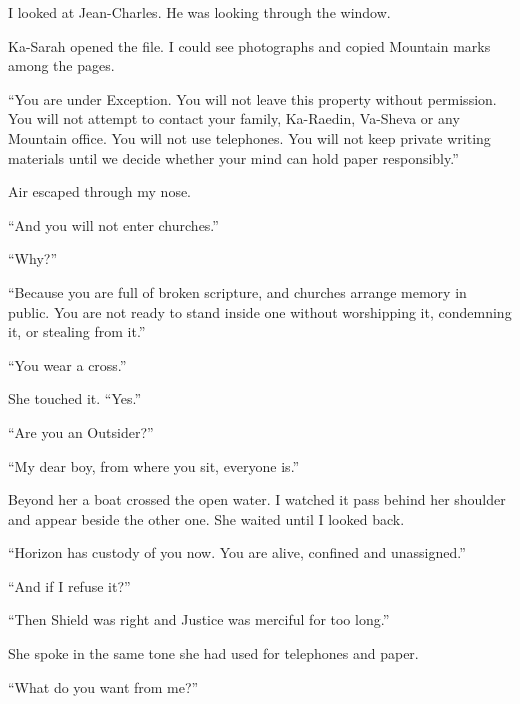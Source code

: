 I looked at Jean-Charles. He was looking through the window.\par

Ka-Sarah opened the file. I could see photographs and copied Mountain marks among the pages.\par

``You are under Exception. You will not leave this property without permission. You will not attempt to contact your family, Ka-Raedin, Va-Sheva or any Mountain office. You will not use telephones. You will not keep private writing materials until we decide whether your mind can hold paper responsibly.''\par

Air escaped through my nose.\par

``And you will not enter churches.''\par

``Why?''\par

``Because you are full of broken scripture, and churches arrange memory in public. You are not ready to stand inside one without worshipping it, condemning it, or stealing from it.''\par

``You wear a cross.''\par

She touched it. ``Yes.''\par

``Are you an Outsider?''\par

``My dear boy, from where you sit, everyone is.''\par

Beyond her a boat crossed the open water. I watched it pass behind her shoulder and appear beside the other one. She waited until I looked back.\par

``Horizon has custody of you now. You are alive, confined and unassigned.''\par

``And if I refuse it?''\par

``Then Shield was right and Justice was merciful for too long.''\par

She spoke in the same tone she had used for telephones and paper.\par

``What do you want from me?''\par

